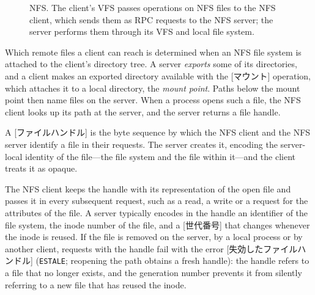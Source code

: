 \documentclass[../main.tex]{subfiles}
\begin{document}
\begin{figure}[htbp]
  \centering
  
  \caption{NFS.  The client's VFS passes operations on NFS files to the NFS
    client, which sends them as RPC requests to the NFS server; the server
    performs them through its VFS and local file system.}
  \label{fig:l14-nfs}
\end{figure}

Which remote files a client can reach is determined when an NFS file
system is attached to the client's directory tree.  A server
\emph{exports} some of its directories, and a client makes an exported
directory available with the [マウント] operation, which
attaches it to a local directory, the \emph{mount point}.  Paths below the
mount point then name files on the server.  When a process opens such a
file, the NFS client looks up its path at the server, and the server
returns a file handle.

\begin{definition}
  A [ファイルハンドル] is the byte sequence by which the
  NFS client and the NFS server identify a file in their requests.  The
  server creates it, encoding the server-local identity of the file---the
  file system and the file within it---and the client treats it as opaque.
\end{definition}

The NFS client keeps the handle with its representation of the open
file and passes it in every subsequent request, such as a read, a write or a
request for the attributes of the file.  A server typically encodes in the
handle an identifier of the file system, the inode number of the file, and
a [世代番号] that changes whenever the inode is
reused.  If the file is removed on the server, by a local process or by
another client, requests with the handle fail with the error
[失効したファイルハンドル] (\texttt{ESTALE};
reopening the path obtains a fresh handle): the handle refers to a file
that no longer exists, and the
generation number prevents it from silently referring to a new file that
has reused the inode.
\end{document}
